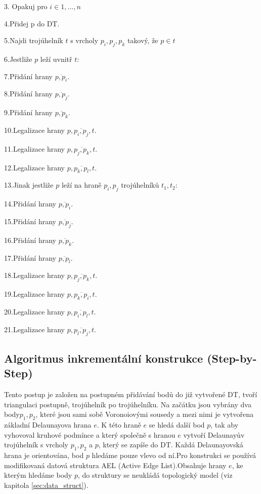 \documentclass[12pt,a4paper]{article}
\begin{document}
3.  Opakuj pro $i \in 1,...,n$

4.\indent  Přidej p do DT.

5.\indent  Najdi trojúhelník $t$ s vrcholy $p_i, p_j, p_k$ takový, že $p \in t$

6.\indent  Jestliže $p$ leží uvnitř $t$:

7.\indent \indent Přidání hrany $\overline{p,p_i}$.

8.\indent \indent Přidání hrany $\overline{p,p_j}$.

9.\indent \indent Přidání hrany $\overline{p,p_k}$.

10.\indent \indent Legalizace hrany $p,\overline{p_i,p_j},t$.

11.\indent \indent Legalizace hrany $p,\overline{p_j,p_k},t$.

12.\indent \indent Legalizace hrany $p,\overline{p_k,p_l},t$.

13.\indent Jinak jestliže $p$ leží na hraně $p_i, p_j$ trojúhelníků $t_1, t_2$:

14.\indent \indent Přidání hrany $\overline{p,p_i}$.

15.\indent \indent Přidání hrany $\overline{p,p_j}$.

16.\indent \indent Přidání hrany $\overline{p,p_k}$.

17.\indent \indent Přidání hrany $\overline{p,p_l}$.

18.\indent \indent Legalizace hrany $p,\overline{p_j,p_k},t$.

19.\indent \indent Legalizace hrany $p,\overline{p_k,p_i},t$.

20.\indent \indent Legalizace hrany $p,\overline{p_i,p_l},t$.

21.\indent \indent Legalizace hrany $p,\overline{p_l,p_j},t$.


\subsection{Algoritmus inkrementální konstrukce (Step-by-Step)}

Tento postup je založen na postupném přidávání bodů do již vytvořené DT, tvoří triangulaci postupně, trojúhelník po trojúhelníku. Na začátku jsou vybrány dva body$p_1, p_2$, které jsou sami sobě Voronoiovými sousedy a mezi nimi je vytvořena základní Delaunayova hrana $e$. K této hraně $e$ se hledá další bod 	$p$, tak aby vyhovoval kruhové podmínce a který společně s hranou $e$ vytvoří Delaunayův trojúhelník s vrcholy $p_1, p_2$ a $p$, který se zapíše do DT. Každá Delaunayovská hrana je orientována, bod $p$ hledáme pouze vlevo od ní.Pro konstrukci se používá modifikovaná datová struktura AEL (Active Edge List).Obsahuje hrany $e$, ke kterým hledáme body $p$, do struktury se neukládá topologický model (viz kapitola \ref{sec:data_struct}).
\end{document}
